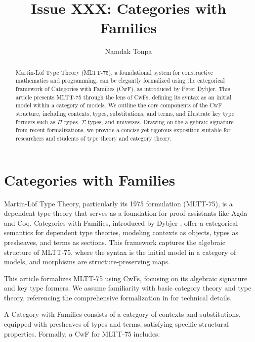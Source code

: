 \documentclass{article}
\begin{document}
\title{Issue XXX: Categories with Families}
\author{Namdak Tonpa}

\maketitle

\begin{abstract}
Martin-Löf Type Theory (MLTT-75), a foundational system for constructive mathematics and programming, can be elegantly formalized using the categorical framework of Categories with Families (CwF), as introduced by Peter Dybjer. This article presents MLTT-75 through the lens of CwFs, defining its syntax as an initial model within a category of models. We outline the core components of the CwF structure, including contexts, types, substitutions, and terms, and illustrate key type formers such as \(\Pi\)-types, \(\Sigma\)-types, and universes. Drawing on the algebraic signature from recent formalizations, we provide a concise yet rigorous exposition suitable for researchers and students of type theory and category theory.
\end{abstract}

\ifincludeTOC
  \tableofcontents
\fi

\newpage
\section{Categories with Families}
Martin-Löf Type Theory, particularly its 1975 formulation (MLTT-75), is a dependent type theory that serves as a foundation for proof assistants like Agda and Coq. Categories with Families, introduced by Dybjer \cite{Dybjer1995}, offer a categorical semantics for dependent type theories, modeling contexts as objects, types as presheaves, and terms as sections. This framework captures the algebraic structure of MLTT-75, where the syntax is the initial model in a category of models, and morphisms are structure-preserving maps.

This article formalizes MLTT-75 using CwFs, focusing on its algebraic signature and key type formers. We assume familiarity with basic category theory and type theory, referencing the comprehensive formalization in \cite{Kaposi2019} for technical details.

A Category with Families consists of a category of contexts and substitutions, equipped with presheaves of types and terms, satisfying specific structural properties. Formally, a CwF for MLTT-75 includes:
\end{document}
